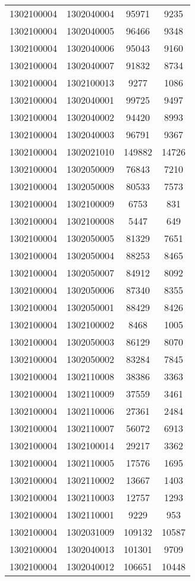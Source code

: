 \begin{longtable}{llcc}
1302100004 & 1302040004 & 95971 & 9235\\
1302100004 & 1302040005 & 96466 & 9348\\
1302100004 & 1302040006 & 95043 & 9160\\
1302100004 & 1302040007 & 91832 & 8734\\
1302100004 & 1302100013 & 9277 & 1086\\
1302100004 & 1302040001 & 99725 & 9497\\
1302100004 & 1302040002 & 94420 & 8993\\
1302100004 & 1302040003 & 96791 & 9367\\
1302100004 & 1302021010 & 149882 & 14726\\
1302100004 & 1302050009 & 76843 & 7210\\
1302100004 & 1302050008 & 80533 & 7573\\
1302100004 & 1302100009 & 6753 & 831\\
1302100004 & 1302100008 & 5447 & 649\\
1302100004 & 1302050005 & 81329 & 7651\\
1302100004 & 1302050004 & 88253 & 8465\\
1302100004 & 1302050007 & 84912 & 8092\\
1302100004 & 1302050006 & 87340 & 8355\\
1302100004 & 1302050001 & 88429 & 8426\\
1302100004 & 1302100002 & 8468 & 1005\\
1302100004 & 1302050003 & 86129 & 8070\\
1302100004 & 1302050002 & 83284 & 7845\\
1302100004 & 1302110008 & 38386 & 3363\\
1302100004 & 1302110009 & 37559 & 3461\\
1302100004 & 1302110006 & 27361 & 2484\\
1302100004 & 1302110007 & 56072 & 6913\\
1302100004 & 1302100014 & 29217 & 3362\\
1302100004 & 1302110005 & 17576 & 1695\\
1302100004 & 1302110002 & 13667 & 1403\\
1302100004 & 1302110003 & 12757 & 1293\\
1302100004 & 1302110001 & 9229 & 953\\
1302100004 & 1302031009 & 109132 & 10587\\
1302100004 & 1302040013 & 101301 & 9709\\
1302100004 & 1302040012 & 106651 & 10448\\

\end{longtable}
